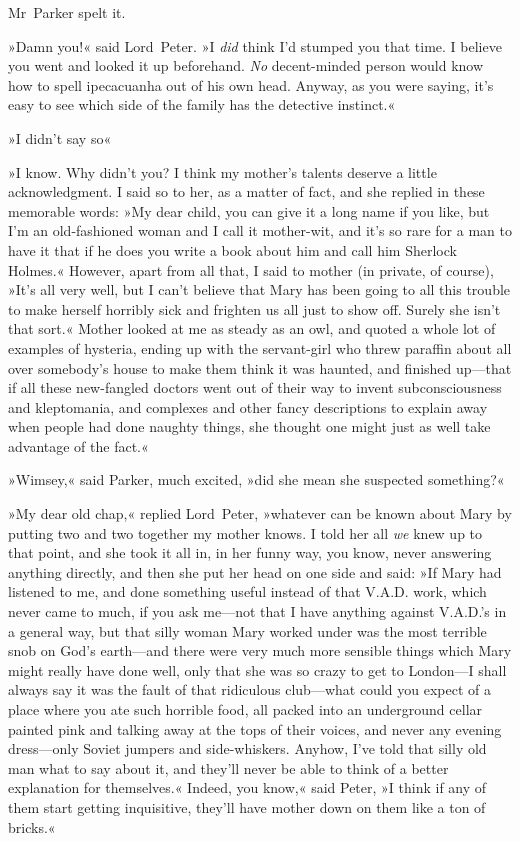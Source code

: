 Mr~Parker spelt it.

»Damn you!« said Lord~Peter. »I \textit{did} think I'd stumped you that time.  I believe you went and looked it up beforehand. \textit{No} decent-minded person would know how to spell ipecacuanha out of his own head. Anyway, as you were saying, it's easy to see which side of the family has the detective instinct.«

»I didn't say so\longdash«

»I know. Why didn't you? I think my mother's talents deserve a little acknowledgment. I said so to her, as a matter of fact, and she replied in these memorable words: »My dear child, you can give it a long name if you like, but I'm an old-fashioned woman and I call it mother-wit, and it's so rare for a man to have it that if he does you write a book about him and call him Sherlock Holmes.« However, apart from all that, I said to mother (in private, of course), »It's all very well, but I can't believe that Mary has been going to all this trouble to make herself horribly sick and frighten us all just to show off. Surely she isn't that sort.« Mother looked at me as steady as an owl, and quoted a whole lot of examples of hysteria, ending up with the servant-girl who threw paraffin about all over somebody's house to make them think it was haunted, and finished up—that if all these new-fangled doctors went out of their way to invent subconsciousness and kleptomania, and complexes and other fancy descriptions to explain away when people had done naughty things, she thought one might just as well take advantage of the fact.«

»Wimsey,« said Parker, much excited, »did she mean she suspected something?«

»My dear old chap,« replied Lord~Peter, »whatever can be known about Mary by putting two and two together my mother knows. I told her all \textit{we} knew up to that point, and she took it all in, in her funny way, you know, never answering anything directly, and then she put her head on one side and said: »If Mary had listened to me, and done something useful instead of that V\@.A\@.D\@. work, which never came to much, if you ask me—not that I have anything against V\@.A\@.D\@.'s in a general way, but that silly woman Mary worked under was the most terrible snob on God's earth—and there were very much more sensible things which Mary might really have done well, only that she was so crazy to get to London—I shall always say it was the fault of that ridiculous club—what could you expect of a place where you ate such horrible food, all packed into an underground cellar painted pink and talking away at the tops of their voices, and never any evening dress—only Soviet jumpers and side-whiskers. Anyhow, I've told that silly old man what to say about it, and they'll never be able to think of a better explanation for themselves.« Indeed, you know,« said Peter, »I think if any of them start getting inquisitive, they'll have mother down on them like a ton of bricks.«

